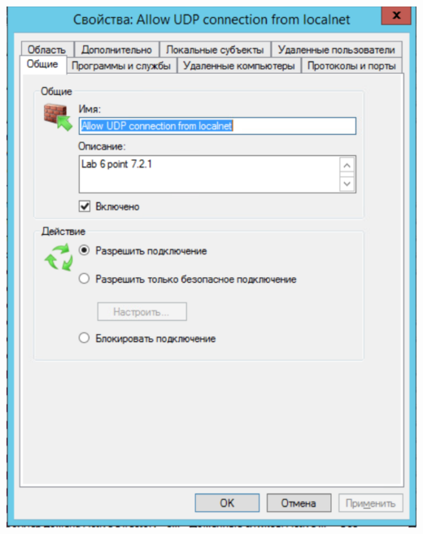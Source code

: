 \documentclass[a4paper,14pt]{extarticle}
\begin{document}
    \begin{center}
        \includegraphics[scale=0.7]{7.3.1.png}
    \end{center}
\end{document}
